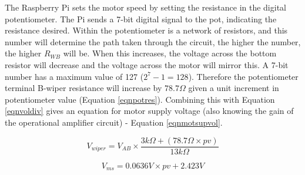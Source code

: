 \documentclass[twoside,a4]{report}
\def\br{\newline \newline \noindent}
\begin{document}
	
	\noindent
	The Raspberry Pi sets the motor speed by setting the resistance in the digital potentiometer. The Pi sends a 7-bit digital signal to the pot, indicating the resistance desired. Within the potentiometer is a network of resistors, and this number will determine the path taken through the circuit, the higher the number, the higher \(R_{WB}\) will be. When this increases, the voltage across the bottom resistor will decrease and the voltage across the motor will mirror this.\br
	A 7-bit number has a maximum value of 127 ($2^7 - 1 = 128$). Therefore the potentiometer terminal B-wiper resistance will increase by $78.7 \Omega$ given a unit increment in potentiometer value (Equation \ref{eqnpotres}). Combining this with Equation \ref{eqnvoldiv} gives an equation for motor supply voltage (also knowing the gain of the operational amplifier circuit) - Equation \ref{eqnmotsupvol}.
	
	\begin{equation}
	V_{wiper} = V_{AB}\times \frac{3k\Omega + \left(78.7\Omega \times pv\right)}{13k\Omega}
	\label{eqnpotres}
	\end{equation}
	
	
	\begin{equation}
	V_{ms} = 0.0636V \times pv + 2.423V
	\label{eqnmotsupvol}
	\end{equation}
	
\end{document}
